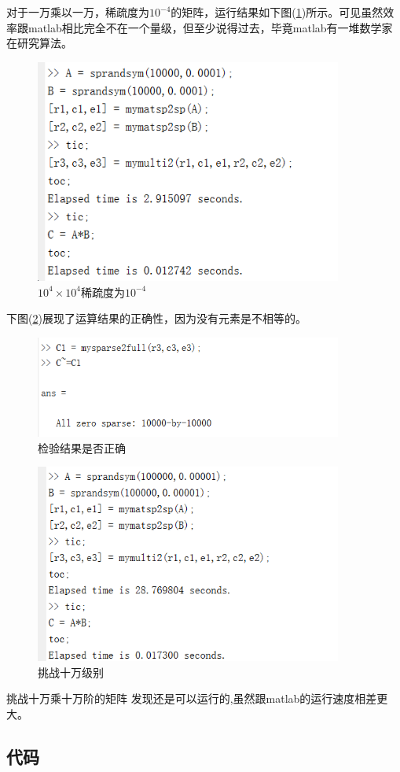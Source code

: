 \documentclass[a4paper,left=2.5cm,right=2.5cm]{article}
\begin{document}
\begin{spacing}{1.6}
		对于一万乘以一万，稀疏度为$10^{-4}$的矩阵，运行结果如下图(\ref{res1})所示。可见虽然效率跟matlab相比完全不在一个量级，但至少说得过去，毕竟matlab有一堆数学家在研究算法。
		\begin{figure}[H]
			\includegraphics[width = 0.9\textwidth]{image/multi_result3.png}
			\caption{$10^4\times10^4$稀疏度为$10^{-4}$}
			\label{res1}
		\end{figure}
		下图(\ref{res2})展现了运算结果的正确性，因为没有元素是不相等的。
		\begin{figure}[H]
			\includegraphics[width=0.9\textwidth]{image/multi_result2.png}
			\caption{检验结果是否正确}
			\label{res2}
		\end{figure}
		\begin{figure}[H]
			\includegraphics[width=0.9\textwidth]{image/multi_result1.png}
			\caption{挑战十万级别}
		\end{figure}
		挑战十万乘十万阶的矩阵
		发现还是可以运行的,虽然跟matlab的运行速度相差更大。
		\subsection{代码}
		
	\end{spacing}
\end{document}
